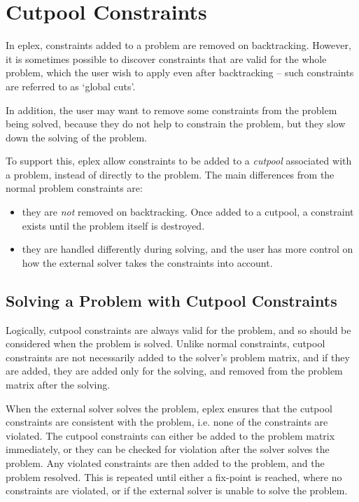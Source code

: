 \section{Cutpool Constraints}

In eplex, constraints added to a problem are removed on
backtracking. However, it is sometimes possible to discover constraints
that are valid for the whole problem, which the user wish to apply even
after backtracking -- such constraints are referred to as `global cuts'. 

In addition, the user may want to remove some constraints from
the problem being solved, because they do not help to constrain the
problem, but they slow down the solving of the problem. 

To support this, eplex allow constraints to be added to a
{\it cutpool} associated with a problem, instead of directly to the
problem. The main differences from the normal problem constraints are:
\begin{itemize}
\item they are {\it not\/} removed on backtracking. Once
added to a cutpool, a constraint exists until the problem itself is
destroyed. 
\item they are handled differently during solving, and the user has more
control on how the external solver takes the constraints into account.
\end{itemize}

\subsection{Solving a Problem with Cutpool Constraints}
Logically, cutpool constraints are always valid for the problem, and so
should be considered when the problem is solved.  Unlike normal
constraints, cutpool constraints are not necessarily added to the
solver's problem matrix, and if they are added, they are added only for the
solving, and removed from the problem matrix after the solving. 

When the external solver 
solves the problem, eplex ensures that the cutpool constraints are
consistent with the problem, i.e. none of the constraints are
violated. The cutpool constraints can either be added to the problem matrix
immediately, or they can be checked for violation after the solver solves
the problem. Any
violated constraints are then added to the problem, and the problem
resolved. This is repeated until either a fix-point is reached, where no
constraints are violated, or if the external solver is unable to solve the
problem. 


